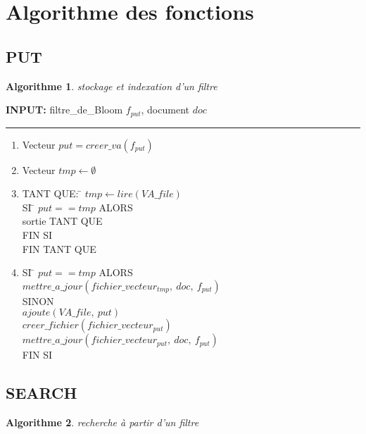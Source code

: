 \documentclass[a4paper,12pt]{report}
\begin{document}
\section{Algorithme des fonctions}
	\subsection{PUT}
\newtheorem{algorithme}{Algorithme}
\begin{algorithme}
	stockage et indexation d'un filtre
\end{algorithme}

\begin{flushleft}
	\begin{framed}
		\textbf{INPUT:} filtre\_de\_Bloom $f_{put}$, document $doc$
		\noindent\rule{\linewidth}{0.5pt}

		\begin{enumerate}
		\item Vecteur $put = creer\_va(f_{put}) $
		\item Vecteur $tmp \leftarrow \emptyset$
		\item 
		\begin{tabbing}
			TANT QUE: \= $tmp \leftarrow lire(VA\_file)$ \\
					\> SI \= $put == tmp$ ALORS\\
					\> \> sortie TANT QUE\\
					\> FIN SI\\
			FIN TANT QUE
	    	\end{tabbing}
		\item
		\begin{tabbing}
			SI \= $put == tmp $ ALORS\\
			\> $mettre\_a\_jour (fichier\_vecteur_{tmp},\ doc,\ f_{put})$\\
			SINON\\
			\> $ajoute(VA\_file,\ put)$\\
			\> $creer\_fichier(fichier\_vecteur_{put})$\\
			\> $mettre\_a\_jour (fichier\_vecteur_{put},\ doc,\ f_{put})$\\
			FIN SI
		\end{tabbing}
		\end{enumerate}
	\end{framed}
\end{flushleft}

\subsection{SEARCH}
\begin{algorithme}
	recherche à partir d'un filtre
\end{algorithme} 
\end{document}
